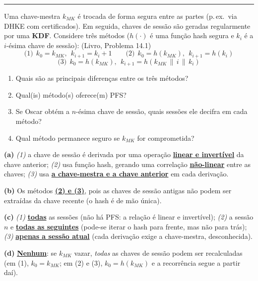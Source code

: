 \documentclass[11pt,a4paper]{article}
\newcommand{\livro}[1]{{\footnotesize\color{black!50}(Livro, Problema #1)}}
\newcommand{\alert}[1]{\textbf{\uline{#1}}}
\newcommand{\exercicio}[1]{%
    \Needspace{8\baselineskip}%
    \par\vspace{1.2em}
    \noindent
    {\color{black!55}\rule[-0.25em]{3pt}{1.6em}}%
    \hspace{0.6em}{\Large\bfseries Exerc\'{i}cio #1}
    \par\vspace{-0.4em}
    \noindent{\color{black!35}\rule{\textwidth}{0.4pt}}
    \par\vspace{0.35em}
}
\newenvironment{resposta}{%
    \begin{respostabox}
    \color{red!70!black}\sloppy
}{%
    \end{respostabox}
}
\begin{document}
\exercicio{1}
Uma chave-mestra $k_{MK}$ \'{e} trocada de forma segura entre as partes (p.\,ex.\ via DHKE com certificados). Em seguida, chaves de sess\~{a}o s\~{a}o geradas regularmente por uma \textbf{KDF}. Considere tr\^{e}s m\'{e}todos ($h(\cdot)$ \'{e} uma fun\c{c}\~{a}o hash segura e $k_i$ \'{e} a $i$-\'{e}sima chave de sess\~{a}o): \livro{14.1}
\[
    \text{(1)}\ \ k_0 = k_{MK},\ \ k_{i+1} = k_i + 1
    \qquad
    \text{(2)}\ \ k_0 = h(k_{MK}),\ \ k_{i+1} = h(k_i)
\]
\[
    \text{(3)}\ \ k_0 = h(k_{MK}),\ \ k_{i+1} = h(k_{MK} \,\|\, i \,\|\, k_i)
\]
\begin{enumerate}[label=(\alph*)]
    \item Quais s\~{a}o as principais diferen\c{c}as entre os tr\^{e}s m\'{e}todos?
    \item Qual(is) m\'{e}todo(s) oferece(m) PFS?
    \item Se Oscar obt\'{e}m a $n$-\'{e}sima chave de sess\~{a}o, quais sess\~{o}es ele decifra em cada m\'{e}todo?
    \item Qual m\'{e}todo permanece seguro se $k_{MK}$ for comprometida?
\end{enumerate}
\begin{resposta}
\textbf{(a)} \emph{(1)} a chave de sess\~{a}o \'{e} derivada por uma opera\c{c}\~{a}o \alert{linear e invert\'{i}vel} da chave anterior; \emph{(2)} usa fun\c{c}\~{a}o hash, gerando uma correla\c{c}\~{a}o \alert{n\~{a}o-linear} entre as chaves; \emph{(3)} usa \alert{a chave-mestra e a chave anterior} em cada deriva\c{c}\~{a}o.

\textbf{(b)} Os m\'{e}todos \alert{(2) e (3)}, pois as chaves de sess\~{a}o antigas n\~{a}o podem ser extra\'{i}das da chave recente (o hash \'{e} de m\~{a}o \'{u}nica).

\textbf{(c)} \emph{(1)} \alert{todas} as sess\~{o}es (n\~{a}o h\'{a} PFS: a rela\c{c}\~{a}o \'{e} linear e invert\'{i}vel); \emph{(2)} a sess\~{a}o $n$ e \alert{todas as seguintes} (pode-se iterar o hash para frente, mas n\~{a}o para tr\'{a}s); \emph{(3)} \alert{apenas a sess\~{a}o atual} (cada deriva\c{c}\~{a}o exige a chave-mestra, desconhecida).

\textbf{(d)} \alert{Nenhum}: se $k_{MK}$ vazar, \emph{todas} as chaves de sess\~{a}o podem ser recalculadas (em (1), $k_0=k_{MK}$; em (2) e (3), $k_0=h(k_{MK})$ e a recorr\^{e}ncia segue a partir da\'{i}).
\end{resposta}
\end{document}
